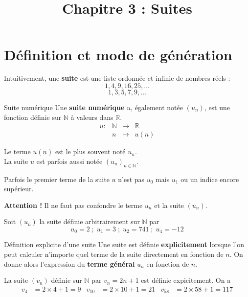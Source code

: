 \documentclass[11pt]{article}
\title{Chapitre 3 : Suites}
\date{}
\author{}
\begin{document}
\maketitle\thispagestyle{fancy}

\section{Définition et mode de génération}
\noindent Intuitivement, une \textbf{suite} est une liste ordonnée et infinie de nombres
réels :
\[
  1, 4, 9, 16, 25, \dots
\]
\[
  1, 3, 5, 7, 9, \dots
\]
\begin{defi}{Suite numérique}
  Une \textbf{suite numérique} $u$, également notée
  $(u_n)$, est une fonction définie sur $\mathbb{N}$ à valeurs dans $\mathbb{R}$.
  \[
  \begin{array}{cccc}
    u: & \mathbb{N} & \to & \mathbb{R} \\
    & n & \mapsto & u(n)
  \end{array}
\]
\end{defi}
\begin{notation}
  Le terme $u(n)$ est le plus souvent noté $u_n$.\\
  La suite $u$ est parfois aussi notée $(u_n)_{n\in\mathbb{N}}$.
\end{notation}

\begin{rmq}
  Parfois le premier terme de la suite $u$ n'est pas $u_0$ mais $u_1$ ou un
  indice encore supérieur.
\end{rmq}
\begin{rmq}
  \textbf{Attention !} Il ne faut pas confondre le terme $u_n$ et la suite
  $(u_n)$.
\end{rmq}

\begin{exemple}
  Soit $(u_n)$ la suite définie arbitrairement sur $\mathbb{N}$ par
  \[
    u_0 = 2
    \;;\;
    u_1 = 3
    \;;\;
    u_2 = 741
    \;;\;
    u_4 = -12 
  \]
\end{exemple}
\begin{defi}{Définition explicite d'une suite}
  Une suite est définie \textbf{explicitement} lorsque l'on peut calculer
  n'importe quel terme de la suite directement en fonction de $n$. On donne
  alors l'expression du \textbf{terme général} $u_n$ en fonction de $n$.
\end{defi}
\begin{exemple}
  La suite $(v_n)$ définie sur $\mathbb{N}$ par $v_n=2n+1$ est définie
  expicitement. On a 
  \begin{align*}
    v_4 &= 2 \times 4+1 = 9 &
    v_{10} &= 2 \times 10 +1 = 21 &
    v_{58} &= 2 \times 58 +1 = 117
  \end{align*}
\end{exemple}
\end{document}
